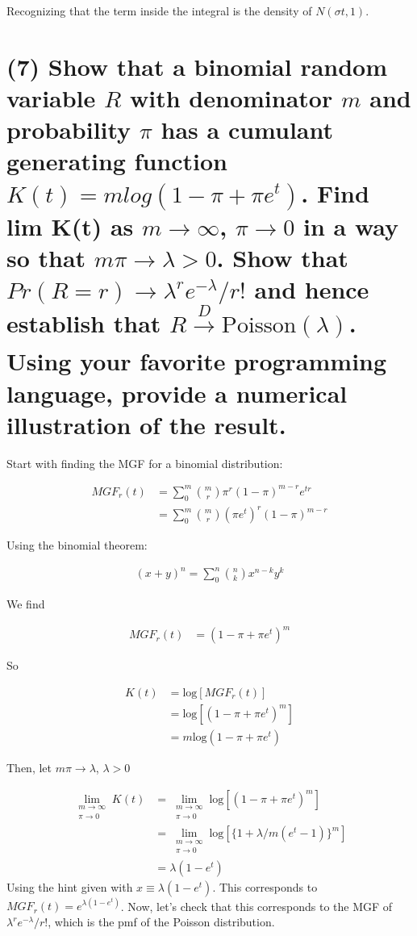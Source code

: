 \documentclass[11pt]{article}
\begin{document}
Recognizing that the term inside the integral is the density of $N(\sigma t, 1)$.


\section*{(7) Show that a binomial random variable $R$ with denominator $m$ and probability $\pi$ has a cumulant generating function $K(t)=mlog(1-\pi+\pi e^t)$. Find lim K(t) as $m \rightarrow \infty$,  $\pi \rightarrow 0$ in a way so that $m\pi \rightarrow \lambda > 0$. Show that $Pr(R=r) \rightarrow \lambda^re^{-\lambda}/r!$ and hence establish that $R \xrightarrow[]{D} \text{Poisson}(\lambda)$. Using your favorite programming language, provide a numerical illustration of the result.}

Start with finding the MGF for a binomial distribution:

\begin{align*}
    MGF_r(t) &= \sum_{0}^{m}{m \choose r} \pi^r (1-\pi)^{m-r}e^{tr}\\
    &= \sum_{0}^{m}{m \choose r} (\pi e^t)^r (1-\pi)^{m-r}
\end{align*}

Using the binomial theorem:


\begin{align*}
    (x+y)^n = \sum_{0}^{n} {n \choose k} x^{n-k}y^k
\end{align*}

We find 

\begin{align*}
    MGF_r(t) &= (1-\pi+\pi e^t)^m
\end{align*}

So 

\begin{align*}
   K(t) &= \text{log}[MGF_r(t)]\\
   &=\text{log}[(1-\pi+\pi e^t)^m]\\
   &=m\text{log}(1-\pi+\pi e^t)
\end{align*}


Then, let $m\pi \to \lambda$,  $\lambda >0$

\begin{align*}
    \lim_{\substack{m\to\infty\\ \pi\to0}} K(t) & =  \lim_{\substack{m\to\infty\\ \pi\to0}} \text{log}[(1-\pi+\pi e^t)^m] \\
    &= \lim_{\substack{m\to\infty\\ \pi\to0}} \text{log}[\{1+\lambda / m (e^t-1)\}^m] \\
    &= \lambda(1-e^t)
\end{align*}
Using the hint given with $x\equiv \lambda(1-e^t)$. This corresponds to $MGF_r(t) = e^{\lambda(1-e^t)}$. Now, let's check that this corresponds to the MGF of $ \lambda^re^{-\lambda}/r!$, which is the pmf of the Poisson distribution.
\end{document}
